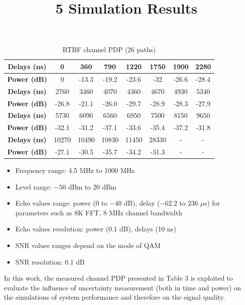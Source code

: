 \documentclass[10pt]{article}
\title{5 Simulation Results }
\author{}
\date{}
\begin{document}
 \maketitle


\begin{table}[h]
    \centering
    \caption{RTBF channel PDP (26 paths)}
    \begin{tabular}{|c|c|c|c|c|c|c|c|}
        \hline
        \textbf{Delays (ns)} & 0    & 360  & 790  & 1220 & 1750 & 1900 & 2280 \\ \hline
        \textbf{Power (dB)}   & 0    & -13.3 & -19.2 & -23.6 & -32   & -26.6 & -28.4 \\ \hline
        \textbf{Delays (ns)} & 2760 & 3460 & 4070 & 4360 & 4670 & 4930 & 5340 \\ \hline
        \textbf{Power (dB)}   & -26.8 & -21.1 & -26.0 & -29.7 & -28.9 & -28.3 & -27.9 \\ \hline
        \textbf{Delays (ns)} & 5730 & 6090 & 6560 & 6950 & 7500 & 8150 & 9650 \\ \hline
        \textbf{Power (dB)}   & -32.1 & -31.2 & -37.1 & -33.6 & -35.4 & -37.2 & -31.8 \\ \hline
        \textbf{Delays (ns)} & 10270 & 10490 & 10830 & 11450 & 28330 & - & - \\ \hline
        \textbf{Power (dB)}   & -27.1 & -30.5 & -35.7 & -34.2 & -31.3 & - & - \\ \hline
    \end{tabular}
\end{table}

\begin{itemize}[label=-]
    \item Frequency range: 4.5 MHz to 1000 MHz
    \item Level range: $-50$ dBm to 20 dBm
    \item Echo values range: power (0 to $-40$ dB), delay ($-62.2$ to 236 $\mu$s) for parameters such as 8K FFT, 8 MHz channel bandwidth
    \item Echo values resolution: power (0.1 dB), delays (10 ns)
    \item SNR values ranges depend on the mode of QAM
    \item SNR resolution: 0.1 dB
\end{itemize}

In this work, the measured channel PDP presented in Table 3 is exploited to evaluate the influence of uncertainty measurement (both in time and power) on the simulations of system performance and therefore on the signal quality.
\end{document}
